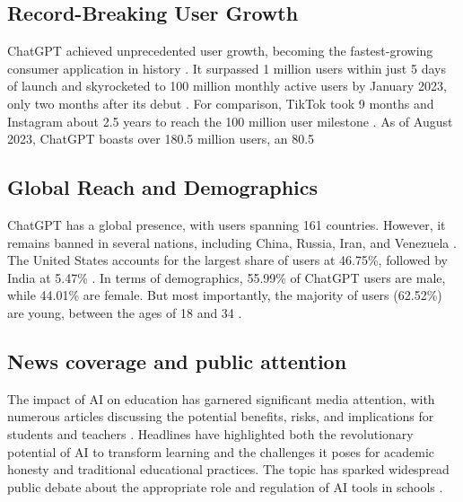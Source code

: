 \documentclass{article}
\begin{document}
\subsection{Record-Breaking User Growth}
ChatGPT achieved unprecedented user growth, becoming the fastest-growing consumer application in history \cite{https://arstechnica.com/information-technology/2023/02/chatgpt-sets-record-for-fastest-growing-user-base-in-history-report-says/}. It surpassed 1 million users within just 5 days of launch and skyrocketed to 100 million monthly active users by January 2023, only two months after its debut \cite{https://meetanshi.com/blog/chatgpt-statistics/} \cite{https://nerdynav.com/chatgpt-statistics/} \cite{https://www.namepepper.com/chatgpt-users}. For comparison, TikTok took 9 months and Instagram about 2.5 years to reach the 100 million user milestone \cite{https://arstechnica.com/information-technology/2023/02/chatgpt-sets-record-for-fastest-growing-user-base-in-history-report-says/}.
As of August 2023, ChatGPT boasts over 180.5 million users, an 80.5%
\subsection{Global Reach and Demographics}
ChatGPT has a global presence, with users spanning 161 countries. However, it remains banned in several nations, including China, Russia, Iran, and Venezuela \cite{https://investingchannel.com/article/585154/15-countries-that-banned-chatgpt}.
The United States accounts for the largest share of users at 46.75\%, followed by India at 5.47\% \cite{https://nerdynav.com/chatgpt-statistics/}. In terms of demographics, 55.99\% of ChatGPT users are male, while 44.01\% are female. But most importantly, the majority of users (62.52\%) are young, between the ages of 18 and 34 \cite{https://nerdynav.com/chatgpt-statistics/}.
\subsection{News coverage and public attention}
The impact of AI on education has garnered significant media attention, with numerous articles discussing the potential benefits, risks, and implications for students and teachers \cite{https://www.bbc.com/news/education-67433036} \cite{https://www.tampabay.com/opinion/2024/02/22/artificial-intelligence-education-return-once-feared-calculator-or-new-opportunity/} \cite{https://theweek.com/education/ai-in-schools-machine-learning}. Headlines have highlighted both the revolutionary potential of AI to transform learning and the challenges it poses for academic honesty and traditional educational practices. The topic has sparked widespread public debate about the appropriate role and regulation of AI tools in schools \cite{https://www.tampabay.com/opinion/2024/02/22/artificial-intelligence-education-return-once-feared-calculator-or-new-opportunity/} \cite{https://theweek.com/education/ai-in-schools-machine-learning}.
\end{document}
